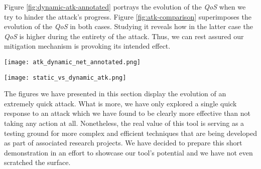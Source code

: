             Figure \ref{fig:dynamic-atk-annotated} portrays the evolution of the \textit{QoS} when we try to hinder the attack's progress. Figure \ref{fig:atk-comparison} superimposes the evolution of the \textit{QoS} in both cases. Studying it reveals how in the latter case the \textit{QoS} is higher during the entirety of the attack. Thus, we can rest assured our mitigation mechanism is provoking its intended effect.\\


            \begin{sidewaysfigure}
                \centering
                \texttt{[image: atk\_dynamic\_net\_annotated.png]}
                \caption[Annotated \textit{QoS} on a Dynamic Topology]{Annotated Evolution of the \textit{QoS} Over Time for a Dynamic Topology.}
                \label{fig:dynamic-atk-annotated}
            \end{sidewaysfigure}

            \begin{sidewaysfigure}
                \centering
                \texttt{[image: static\_vs\_dynamic\_atk.png]}
                \caption[Attack Mitigation Effect vs. Baseline Case]{Comparison of the Evolution of the \textit{QoS}. \textit{Blue} - Base Case. \textit{Orange} - Mitigated Attack.}
                \label{fig:atk-comparison}
            \end{sidewaysfigure}

            

        The figures we have presented in this section display the evolution of an extremely quick attack. What is more, we have only explored a single quick response to an attack which we have found to be clearly more effective than not taking any action at all. Nonetheless, the real value of this tool is serving as a testing ground for more complex and efficient techniques that are being developed as part of associated research projects. We have decided to prepare this short demonstration in an effort to showcase our tool's potential and we have not even scratched the surface.\\
